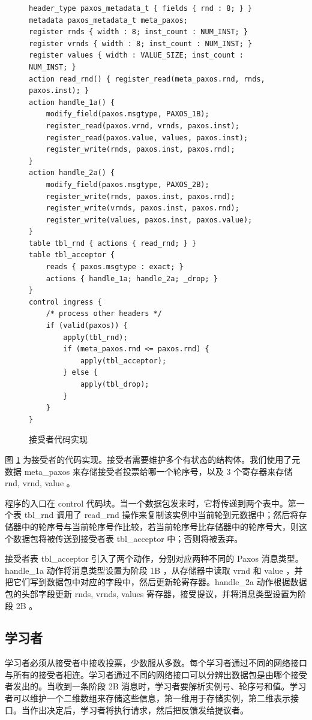 \documentclass[conference]{IEEEtran}
\begin{document}
\begin{figure}
\centering
\begin{lstlisting}
header_type paxos_metadata_t { fields { rnd : 8; } }
metadata paxos_metadata_t meta_paxos;
register rnds {	width : 8; inst_count : NUM_INST; }
register vrnds { width : 8; inst_count : NUM_INST; }
register values { width : VALUE_SIZE; inst_count : NUM_INST; }
action read_rnd() { register_read(meta_paxos.rnd, rnds, paxos.inst); }
action handle_1a() {
	modify_field(paxos.msgtype, PAXOS_1B);
	register_read(paxos.vrnd, vrnds, paxos.inst);
	register_read(paxos.value, values, paxos.inst);
	register_write(rnds, paxos.inst, paxos.rnd);
}
action handle_2a() {
	modify_field(paxos.msgtype, PAXOS_2B);
	register_write(rnds, paxos.inst, paxos.rnd);
	register_write(vrnds, paxos.inst, paxos.rnd);
	register_write(values, paxos.inst, paxos.value);
}
table tbl_rnd { actions { read_rnd; } }
table tbl_acceptor {
	reads { paxos.msgtype : exact; }
	actions { handle_1a; handle_2a; _drop; }
}
control ingress {
	/* process other headers */
	if (valid(paxos)) {
		apply(tbl_rnd);
		if (meta_paxos.rnd <= paxos.rnd) {
			apply(tbl_acceptor);
		} else {
			apply(tbl_drop);
		}
	}
}
\end{lstlisting}
\caption{接受者代码实现}
\label{l5}
\end{figure}

图 \ref{l5} 为接受者的代码实现。接受者需要维护多个有状态的结构体。我们使用了元数据 meta\_paxos 来存储接受者投票给哪一个轮序号，以及 3 个寄存器来存储 rnd, vrnd, value 。

程序的入口在 control 代码块。当一个数据包发来时，它将传递到两个表中。第一个表 tbl\_rnd 调用了 read\_rnd 操作来复制该实例中当前轮到元数据中；然后将存储器中的轮序号与当前轮序号作比较，若当前轮序号比存储器中的轮序号大，则这个数据包将被传送到接受者表 tbl\_acceptor 中；否则将被丢弃。

接受者表 tbl\_acceptor 引入了两个动作，分别对应两种不同的 Paxos 消息类型。handle\_1a 动作将消息类型设置为阶段 1B ，从存储器中读取 vrnd 和 value ，并把它们写到数据包中对应的字段中，然后更新轮寄存器。handle\_2a 动作根据数据包的头部字段更新 rnds, vrnds, values 寄存器，接受提议，并将消息类型设置为阶段 2B 。

\subsection{学习者}

学习者必须从接受者中接收投票，少数服从多数。每个学习者通过不同的网络接口与所有的接受者相连。学习者通过不同的网络接口可以分辨出数据包是由哪个接受者发出的。当收到一条阶段 2B 消息时，学习者要解析实例号、轮序号和值。学习者可以维护一个二维数组来存储这些信息，第一维用于存储实例，第二维表示接口。当作出决定后，学习者将执行请求，然后把反馈发给提议者。
\end{document}
